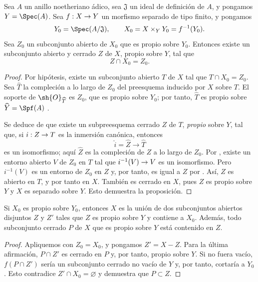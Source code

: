 \documentclass[oneside]{amsart}
\makeatletter
\newcommand{\ega@arrow}[2]{\mathchoice{#1}{#2}{#2}{#2}}
\renewcommand{\to}{\ega@arrow{\longrightarrow}{\rightarrow}}
\let\EGAOriginalLabel\label
\renewcommand{\label}[1]{\phantomsection\EGAOriginalLabel{#1}}
\makeatother
\begin{document}
\begin{proposition}[5.5.1]
\label{III.5.5.1}
Sea $A$ un anillo noetheriano ádico, sea $\mathfrak{J}$ un ideal
de definición de $A$, y pongamos $Y=\Spec(A)$. Sea $f:X\to Y$ un
morfismo separado de tipo finito, y pongamos
\[
  Y_0=\Spec(A/\mathfrak{J}),\qquad
  X_0=X\times_Y Y_0=f^{-1}(Y_0).
\]
Sea $Z_0$ un subconjunto abierto de $X_0$ que es propio sobre $Y_0$.
Entonces existe un subconjunto abierto y cerrado $Z$ de $X$, propio sobre
$Y$, tal que
\[
  Z\cap X_0=Z_0.
\]
\end{proposition}

\begin{proof}
Por hipótesis, existe un subconjunto abierto $T$ de $X$ tal que
$T\cap X_0=Z_0$. Sea $\widehat{T}$ la compleción a lo largo de $Z_0$
del preesquema inducido por $X$ sobre $T$. El soporte de
$\sh{O}_{\widehat{T}}$ es $Z_0$, que es propio sobre $Y_0$;
por tanto, $\widehat{T}$ es propio sobre
$\widehat{Y}=\Spf(A)$ .

Se deduce de  que existe un subpreesquema cerrado
$Z$ de $T$, \emph{propio} sobre $Y$, tal que, si
$i:Z\to T$ es la inmersión canónica, entonces
\[
  \widehat i=\widehat{Z}\longrightarrow\widehat{T}
\]
es un isomorfismo; aquí $\widehat{Z}$ es la compleción de $Z$
a lo largo de $Z_0$. Por , existe un entorno abierto
$V$ de $Z_0$ en $T$ tal que
$i^{-1}(V)\to V$ es un isomorfismo. Pero $i^{-1}(V)$ es un
entorno de $Z_0$ en $Z$ y, por tanto, es igual a $Z$ por
. Así, $Z$ es abierto en $T$, y por tanto en $X$.
También es cerrado en $X$, pues $Z$ es propio sobre $Y$ y $X$ es
separado sobre $Y$. Esto demuestra la proposición.
\end{proof}

\begin{corollary}[5.5.2]
\label{III.5.5.2}
Si $X_0$ es propio sobre $Y_0$, entonces $X$ es la unión de dos
subconjuntos abiertos disjuntos $Z$ y $Z'$ tales que $Z$ es propio sobre
$Y$ y contiene a $X_0$. Además, todo subconjunto cerrado $P$ de $X$
que es propio sobre $Y$ está contenido en $Z$.
\end{corollary}

\begin{proof}
Apliquemos  con $Z_0=X_0$, y pongamos $Z'=X-Z$. Para la
última afirmación, $P\cap Z'$ es cerrado en $P$ y, por tanto, propio
sobre $Y$. Si no fuera vacío, $f(P\cap Z')$ sería un subconjunto cerrado
no vacío de $Y$ y, por tanto, cortaría a $Y_0$
. Esto contradice
$Z'\cap X_0=\varnothing$ y demuestra que $P\subset Z$.
\end{proof}
\end{document}
